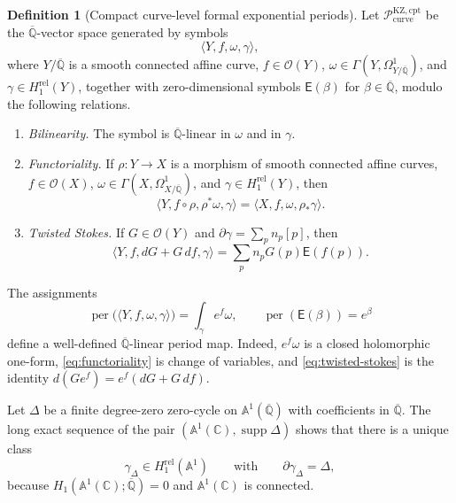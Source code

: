 \documentclass[11pt]{article}
\numberwithin{equation}{section}
\theoremstyle{definition}
\newtheorem{definition}[definition]{Definition}
\theoremstyle{remark}
\newcommand{\C}{\mathbb C}
\newcommand{\Qbar}{\overline{\mathbb Q}}
\newcommand{\Aone}{\mathbb A^1}
\newcommand{\supp}{\operatorname{supp}}
\newcommand{\per}{\operatorname{per}}
\newcommand{\Pcal}{\mathcal P}
\newcommand{\Ocal}{\mathcal O}
\begin{document}
\begin{definition}[Compact curve-level formal exponential periods]
\label{def:curve-space}
Let $\Pcal_{\mathrm{curve}}^{\mathrm{KZ,cpt}}$ be the $\Qbar$-vector space
generated by symbols
\[
  \langle Y,f,\omega,\gamma\rangle,
\]
where $Y/\Qbar$ is a smooth connected affine curve,
$f\in\Ocal(Y)$, $\omega\in\Gamma(Y,\Omega^1_{Y/\Qbar})$, and
$\gamma\in H_1^{\mathrm{rel}}(Y)$, together with zero-dimensional symbols
$\mathsf E(\beta)$ for $\beta\in\Qbar$, modulo the following relations.

\begin{enumerate}[label=\textup{(K\arabic*)},leftmargin=3.2em]
\item \emph{Bilinearity.}  The symbol is $\Qbar$-linear in $\omega$ and
in $\gamma$.

\item \emph{Functoriality.}  If $\rho:Y\to X$ is a morphism of smooth
connected affine curves, $f\in\Ocal(X)$,
$\omega\in\Gamma(X,\Omega^1_{X/\Qbar})$, and
$\gamma\in H_1^{\mathrm{rel}}(Y)$, then
\begin{equation}\label{eq:functoriality}
  \langle Y,f\circ\rho,\rho^*\omega,\gamma\rangle
  =\langle X,f,\omega,\rho_*\gamma\rangle.
\end{equation}

\item \emph{Twisted Stokes.}  If $G\in\Ocal(Y)$ and
$\partial\gamma=\sum_p n_p[p]$, then
\begin{equation}\label{eq:twisted-stokes}
  \langle Y,f,dG+G\,df,\gamma\rangle
  =\sum_p n_pG(p)\mathsf E(f(p)).
\end{equation}
\end{enumerate}
\end{definition}

The assignments
\begin{equation}\label{eq:period-map}
  \per\bigl(\langle Y,f,\omega,\gamma\rangle\bigr)
  =\int_\gamma e^f\omega,
  \qquad
  \per(\mathsf E(\beta))=e^\beta
\end{equation}
define a well-defined $\Qbar$-linear period map.  Indeed, $e^f\omega$ is a
closed holomorphic one-form, \eqref{eq:functoriality} is change of variables,
and \eqref{eq:twisted-stokes} is the identity
$d(Ge^f)=e^f(dG+G\,df)$.

Let $\Delta$ be a finite degree-zero zero-cycle on $\Aone(\Qbar)$ with
coefficients in $\Qbar$.  The long exact sequence of the pair
$(\Aone(\C),\supp\Delta)$ shows that there is a unique class
\[
  \gamma_\Delta\in H_1^{\mathrm{rel}}(\Aone)
  \qquad\text{with}\qquad
  \partial\gamma_\Delta=\Delta,
\]
because $H_1(\Aone(\C);\Qbar)=0$ and $\Aone(\C)$ is connected.
\end{document}
